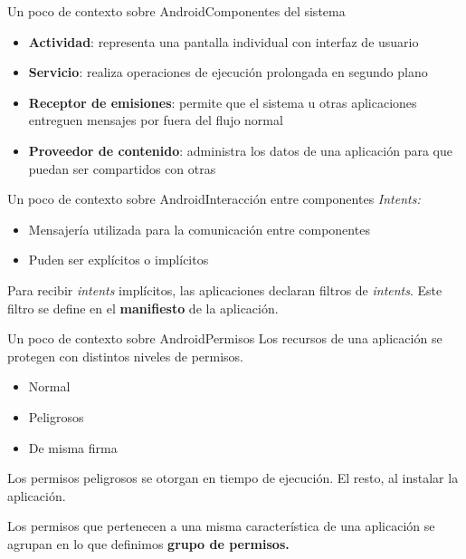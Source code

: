 \documentclass[pdf, handout]{beamer} %
\begin{document}
\begin{frame}{Un poco de contexto sobre Android}{Componentes del sistema}
    \begin{itemize}[<+->]
        \item \textbf{Actividad}: representa una pantalla individual con interfaz de usuario
        \item \textbf{Servicio}: realiza operaciones de ejecución prolongada en segundo plano
        \item \textbf{Receptor de emisiones}: permite que el sistema u otras aplicaciones entreguen
              mensajes por fuera del flujo normal
        \item \textbf{Proveedor de contenido}: administra los datos de una aplicación para que
              puedan ser compartidos con otras
    \end{itemize}
\end{frame}

\begin{frame}{Un poco de contexto sobre Android}{Interacción entre componentes}
    \textit{Intents:} \\
    \begin{itemize}
        \item Mensajería utilizada para la comunicación entre componentes \pause
        \item Puden ser explícitos o implícitos
    \end{itemize}
    \vspace{20px} \pause
    Para recibir \textit{intents} implícitos, las aplicaciones declaran filtros de \textit{intents}.
    Este filtro se define en el \textbf{manifiesto} de la aplicación.
\end{frame}

\begin{frame}{Un poco de contexto sobre Android}{Permisos}
    Los recursos de una aplicación se protegen con distintos niveles de permisos.
    \begin{itemize}[<+->]
        \item Normal
        \item Peligrosos
        \item De misma firma
    \end{itemize}
    \vspace{20px} \pause Los permisos peligrosos se  otorgan en tiempo de ejecución. El resto, al
    instalar la aplicación.

    \vspace{20px} \pause Los permisos que pertenecen a una misma característica de una aplicación
    se agrupan en lo que definimos \textbf{grupo de permisos.}
\end{frame}
\end{document}
